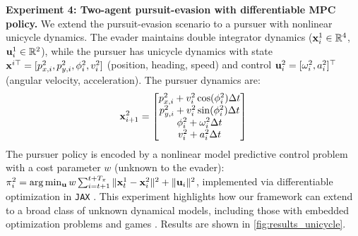 \textbf{Experiment 4: Two-agent pursuit-evasion with differentiable MPC policy.}
We extend the pursuit-evasion scenario to a pursuer with nonlinear unicycle dynamics. 
The evader maintains double integrator dynamics ($\mathbf{x}^1_i \in \mathbb{R}^4$, $\mathbf{u}^1_i \in \mathbb{R}^2$), while the pursuer has unicycle dynamics with state $\mathbf{x}^{i\top} = [p_{x,i}^2, p_{y,i}^2, \phi_i^2, v_i^2]$ (position, heading, speed) and control $\mathbf{u}^2_i = [\omega^2_i, a_i^2]^\top$ (angular velocity, acceleration). 
The pursuer dynamics are:
\begin{equation*}
    \mathbf{x}^2_{i+1} = \begin{bmatrix} 
        p_{x,i}^2 +  v_i^2 \cos(\phi_i^2)\Delta t \\ 
        p_{y,i}^2 +  v_i^2 \sin(\phi_i^2)\Delta t \\
        \phi_i^2 +  \omega_i^2 \Delta t\\
        v_i^2 +  a_i^2 \Delta t
    \end{bmatrix}
\end{equation*}
The pursuer policy is encoded by a nonlinear model predictive control problem with a cost parameter $w$ (unknown to the evader): $\mathbf{\pi}^2_i = \arg\min_{\mathbf{u}} w\sum_{i=t+1}^{t + T_{\mathbf{\pi}}}\|\mathbf{x}^1_t - \mathbf{x}^2_i\|^2 + \|\mathbf{u}_i\|^2$, implemented via differentiable optimization in \texttt{JAX} \cite{bradbury2018jax}. This experiment highlights how our framework can extend to a broad class of unknown dynamical models, including those with embedded optimization problems and games \cite{agrawal2019differentiable, amos2017optnet, blondel2022efficient, JMLR:TorchOpt, liu2023learning, liu2024auto, palafox2024smooth}. Results are shown in \cref{fig:results_unicycle}.




